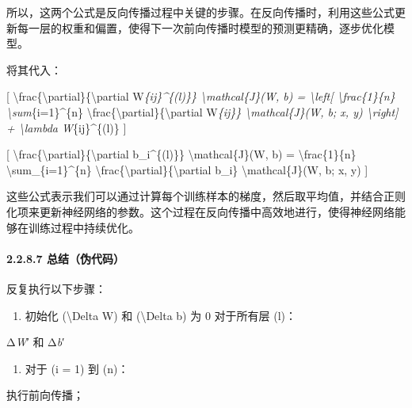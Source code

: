 所以，这两个公式是反向传播过程中关键的步骤。在反向传播时，利用这些公式更新每一层的权重和偏置，使得下一次前向传播时模型的预测更精确，逐步优化模型。

将其代入：

{[}
\textbackslash frac\{\textbackslash partial\}\{\textbackslash partial
W\emph{\{ij\}\^{}\{(l)\}\} \textbackslash mathcal\{J\}(W, b) =
\textbackslash left{[} \textbackslash frac\{1\}\{n\}
\textbackslash sum}\{i=1\}\^{}\{n\}
\textbackslash frac\{\textbackslash partial\}\{\textbackslash partial
W\emph{\{ij\}\} \textbackslash mathcal\{J\}(W, b; x, y)
\textbackslash right{]} + \textbackslash lambda W}\{ij\}\^{}\{(l)\} {]}

{[}
\textbackslash frac\{\textbackslash partial\}\{\textbackslash partial
b\_i\^{}\{(l)\}\} \textbackslash mathcal\{J\}(W, b) =
\textbackslash frac\{1\}\{n\} \textbackslash sum\_\{i=1\}\^{}\{n\}
\textbackslash frac\{\textbackslash partial\}\{\textbackslash partial
b\_i\} \textbackslash mathcal\{J\}(W, b; x, y) {]}


这些公式表示我们可以通过计算每个训练样本的梯度，然后取平均值，并结合正则化项来更新神经网络的参数。这个过程在反向传播中高效地进行，使得神经网络能够在训练过程中持续优化。

\paragraph{\texorpdfstring{\textbf{2.2.8.7}
\textbf{总结（伪代码）}}{2.2.8.7 总结（伪代码）}}\label{2287-ux603bux7ed3ux4f2aux4ee3ux7801}

反复执行以下步骤：

\begin{enumerate}
\def\labelenumi{\arabic{enumi}.}
\item
  初始化 (\textbackslash Delta W\textquotesingle{}) 和
  (\textbackslash Delta b\textquotesingle{}) 为 0 对于所有层 (l)：
\end{enumerate}

Δ\emph{W}′ 和 Δ\emph{b}′

\begin{enumerate}
\def\labelenumi{\arabic{enumi}.}
\item
  对于 (i = 1) 到 (n)：
\end{enumerate}

执行前向传播；

